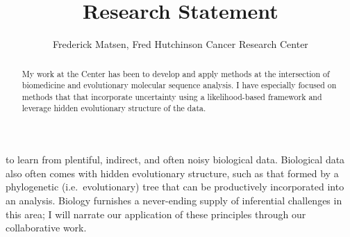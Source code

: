 \documentclass[hyper]{tufte-handout}
\title{Research Statement}
\author{Frederick Matsen, Fred Hutchinson Cancer Research Center} %
\begin{document}
\maketitle

\begin{abstract}
\noindent
My work at the Center has been to develop and apply methods at the intersection of biomedicine and evolutionary molecular sequence analysis.
I have especially focused on methods that that incorporate uncertainty using a likelihood-based framework and leverage hidden evolutionary structure of the data.
\end{abstract}


 to learn from plentiful, indirect, and often noisy biological data.
Biological data also often comes with hidden evolutionary structure, such as that formed by a phylogenetic (i.e.\ evolutionary) tree that can be productively incorporated into an analysis.
Biology furnishes a never-ending supply of inferential challenges in this area; I will narrate our application of these principles through our collaborative work.
\end{document}
